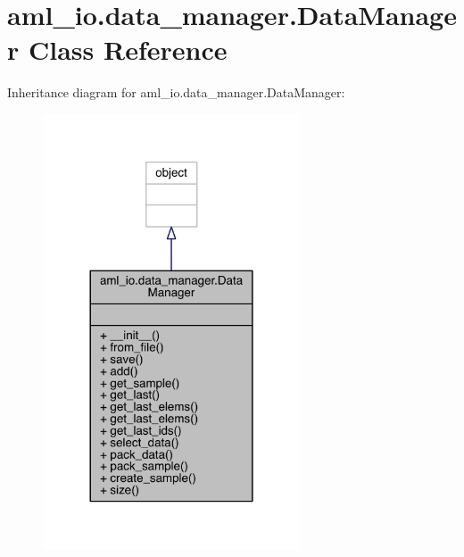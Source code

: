 \hypertarget{classaml__io_1_1data__manager_1_1_data_manager}{}\section{aml\+\_\+io.\+data\+\_\+manager.\+Data\+Manager Class Reference}
\label{classaml__io_1_1data__manager_1_1_data_manager}


Inheritance diagram for aml\+\_\+io.\+data\+\_\+manager.\+Data\+Manager\+:
\nopagebreak
\begin{figure}[H]
\begin{center}
\leavevmode
\includegraphics[width=216pt]{classaml__io_1_1data__manager_1_1_data_manager__inherit__graph}
\end{center}
\end{figure}


